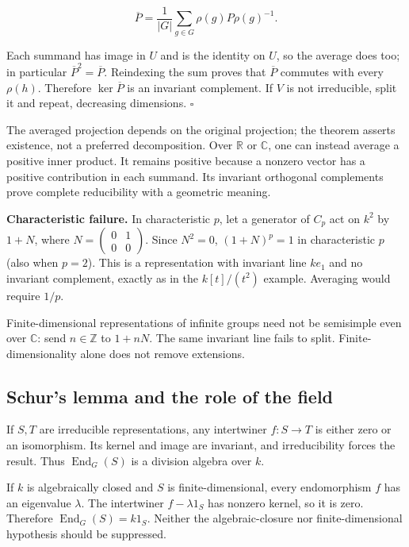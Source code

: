\documentclass[
  11pt,
]{article}
\begin{document}
\[\overline P=\frac1{|G|}\sum_{g\in G}\rho(g)P\rho(g)^{-1}.\]

Each summand has image in \(U\) and is the identity on \(U\), so the
average does too; in particular \(\overline P^2=\overline P\).
Reindexing the sum proves that \(\overline P\) commutes with every
\(\rho(h)\). Therefore \(\ker\overline P\) is an invariant complement.
If \(V\) is not irreducible, split it and repeat, decreasing dimensions.
\(\square\)

The averaged projection depends on the original projection; the theorem
asserts existence, not a preferred decomposition. Over \(\mathbb R\) or
\(\mathbb C\), one can instead average a positive inner product. It
remains positive because a nonzero vector has a positive contribution in
each summand. Its invariant orthogonal complements prove complete
reducibility with a geometric meaning.

\textbf{Characteristic failure.} In characteristic \(p\), let a
generator of \(C_p\) act on \(k^2\) by \(1+N\), where
\(N=\begin{pmatrix}0&1\\0&0\end{pmatrix}\). Since \(N^2=0\),
\((1+N)^p=1\) in characteristic \(p\) (also when \(p=2\)). This is a
representation with invariant line \(ke_1\) and no invariant complement,
exactly as in the \(k[t]/(t^2)\) example. Averaging would require
\(1/p\).

Finite-dimensional representations of infinite groups need not be
semisimple even over \(\mathbb C\): send \(n\in\mathbb Z\) to \(1+nN\).
The same invariant line fails to split. Finite-dimensionality alone does
not remove extensions.

\subsection{Schur's lemma and the role of the
field}\label{schurs-lemma-and-the-role-of-the-field}

If \(S,T\) are irreducible representations, any intertwiner \(f:S\to T\)
is either zero or an isomorphism. Its kernel and image are invariant,
and irreducibility forces the result. Thus \(\operatorname{End}_G(S)\)
is a division algebra over \(k\).

If \(k\) is algebraically closed and \(S\) is finite-dimensional, every
endomorphism \(f\) has an eigenvalue \(\lambda\). The intertwiner
\(f-\lambda1_S\) has nonzero kernel, so it is zero. Therefore
\(\operatorname{End}_G(S)=k1_S\). Neither the algebraic-closure nor
finite-dimensional hypothesis should be suppressed.
\end{document}
